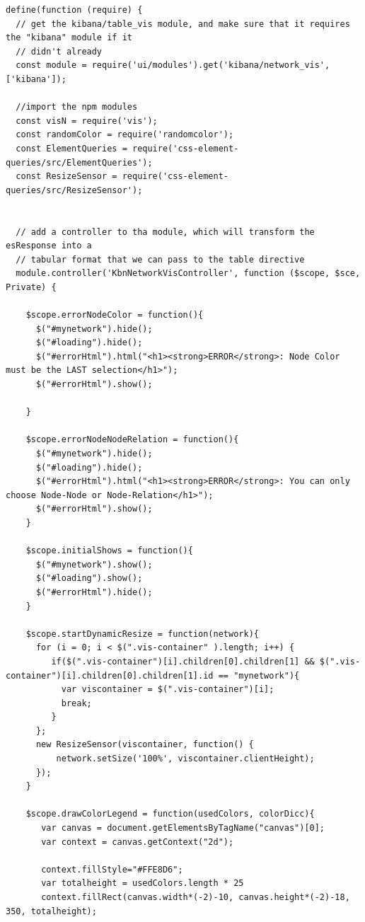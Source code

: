 \documentclass[a4paper, 12pt]{book}
\begin{document}
\begin{lstlisting}[frame=single]
define(function (require) {
  // get the kibana/table_vis module, and make sure that it requires the "kibana" module if it
  // didn't already
  const module = require('ui/modules').get('kibana/network_vis', ['kibana']);

  //import the npm modules
  const visN = require('vis');
  const randomColor = require('randomcolor');
  const ElementQueries = require('css-element-queries/src/ElementQueries');
  const ResizeSensor = require('css-element-queries/src/ResizeSensor');


  // add a controller to tha module, which will transform the esResponse into a
  // tabular format that we can pass to the table directive
  module.controller('KbnNetworkVisController', function ($scope, $sce, Private) {

    $scope.errorNodeColor = function(){
      $("#mynetwork").hide();
      $("#loading").hide();
      $("#errorHtml").html("<h1><strong>ERROR</strong>: Node Color must be the LAST selection</h1>");
      $("#errorHtml").show();

    }

    $scope.errorNodeNodeRelation = function(){
      $("#mynetwork").hide();
      $("#loading").hide();
      $("#errorHtml").html("<h1><strong>ERROR</strong>: You can only choose Node-Node or Node-Relation</h1>");
      $("#errorHtml").show();
    }

    $scope.initialShows = function(){
      $("#mynetwork").show();
      $("#loading").show();
      $("#errorHtml").hide();
    }

    $scope.startDynamicResize = function(network){
      for (i = 0; i < $(".vis-container" ).length; i++) {
         if($(".vis-container")[i].children[0].children[1] && $(".vis-container")[i].children[0].children[1].id == "mynetwork"){
           var viscontainer = $(".vis-container")[i];
           break;
         }
      };
      new ResizeSensor(viscontainer, function() {
          network.setSize('100%', viscontainer.clientHeight);
      });
    }

    $scope.drawColorLegend = function(usedColors, colorDicc){
       var canvas = document.getElementsByTagName("canvas")[0];
       var context = canvas.getContext("2d");

       context.fillStyle="#FFE8D6";
       var totalheight = usedColors.length * 25
       context.fillRect(canvas.width*(-2)-10, canvas.height*(-2)-18, 350, totalheight);


\end{lstlisting}
\end{document}

